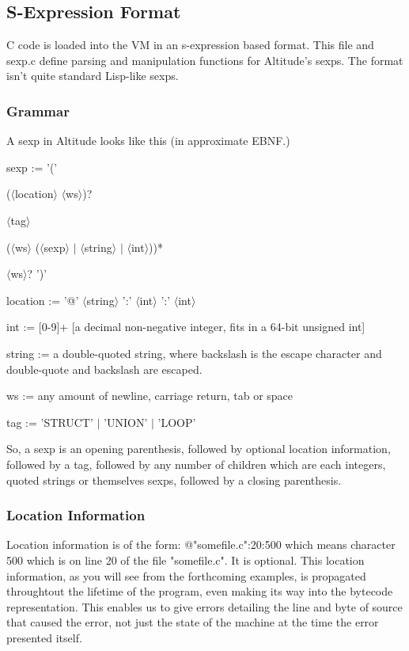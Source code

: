 \documentclass[10pt,a4paper]{report}
\begin{document}
\subsection{S-Expression Format}
C code is loaded into the VM in an s-expression based format. This file and sexp.c define parsing and manipulation functions for Altitude's sexps. The format isn't quite standard Lisp-like sexps.

\subsubsection{Grammar}
A sexp in Altitude looks like this (in approximate EBNF.)
 
\begin{list}{}{}
\item sexp := '(' 
\item ($\langle$location$\rangle$ $\langle$ws$\rangle$)?
\item $\langle$tag$\rangle$
\item ($\langle$ws$\rangle$ ($\langle$sexp$\rangle$ $\vert$ $\langle$string$\rangle$ $\vert$ $\langle$int$\rangle$))*
\item $\langle$ws$\rangle$? ')'
\item
\item location := '@' $\langle$string$\rangle$ ':' $\langle$int$\rangle$ ':' $\langle$int$\rangle$
\item
\item int := [0-9]+ [a decimal non-negative integer, fits in a 64-bit unsigned int]
\item
\item string := a double-quoted string, where backslash is the escape character and double-quote and backslash are escaped.
\item
\item ws := any amount of newline, carriage return, tab or space
\item
\item tag := 'STRUCT' $\vert$ 'UNION' $\vert$ 'LOOP'
\end{list}

So, a sexp is an opening parenthesis, followed by optional location
information, followed by a tag, followed by any number of children
which are each integers, quoted strings or themselves sexps,
followed by a closing parenthesis.

\subsubsection{Location Information}
Location information is of the form: @"somefile.c":20:500 which means character 500 which is on line 20 of the file
"somefile.c". It is optional. This location information, as you will see from the forthcoming examples, is propagated throughtout the lifetime of the program, even making its way into the bytecode representation. This enables us to give errors detailing the line and byte of source that caused the error, not just the state of the machine at the time the error presented itself.
\end{document}
